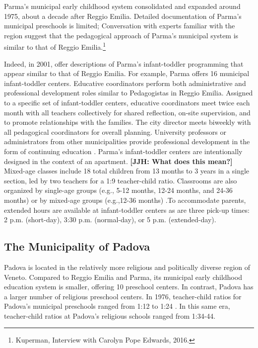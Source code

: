 Parma's municipal early childhood system consolidated and expanded around 1975, about a decade after Reggio Emilia. Detailed documentation of Parma's municipal preschools is limited; Conversation with experts familiar with the region suggest that the pedagogical approach of Parma's municipal system is similar to that of Reggio Emilia.\footnote{Kuperman, Interview with Carolyn Pope Edwards, 2016.}

Indeed, in 2001,\citet{Terzi-Cantarelli_2001_Parma} offer descriptions of Parma's infant-toddler programming that appear similar to that of Reggio Emilia. For example, Parma offers 16 municipal infant-toddler centers. Educative coordinators perform both administrative and professional development roles similar to Pedagogistas in Reggio Emilia. Assigned to a specific set of infant-toddler centers, educative coordinators meet twice each month with all teachers collectively for shared reflection, on-site supervision, and to promote relationships with the families. The city director meets biweekly with all pedagogical coordinators for overall planning. University professors or administrators from other municipalities provide professional development in the form of continuing education \citep{Terzi-Cantarelli_2001_Parma}. Parma's infant-toddler centers are intentionally designed in the context of an apartment. \textbf{[JJH: What does this mean?]} Mixed-age classes include 18 total children from 13 months to 3 years in a single section, led by two teachers  for a 1:9 teacher-child ratio. Classrooms are also organized by single-age groups (e.g., 5-12 months, 12-24 months, and 24-36 months) or by mixed-age groups (e.g.,12-36 months) \citep{Majorano-etal_2009_CC-in-P}.To accommodate parents, extended hours are available at infant-toddler centers as are three pick-up times: 2 p.m. (short-day), 3:30 p.m. (normal-day), or 5 p.m. (extended-day).

\subsection{The Municipality of Padova}

Padova is located in the relatively more religious and politically diverse region of Veneto. Compared to Reggio Emilia and Parma, its municipal early childhood education system is smaller, offering 10 preschool centers. In contrast, Padova has a larger number of religious preschool centers. In 1976, teacher-child ratios for Padova's municipal preschools ranged from 1:12 to 1:24 \citep{Padova-Admin-Data_1964-2011,CEHD_2016_Historical-Analysis}. In this same era, teacher-child ratios at Padova's religious schools ranged from 1:34-44.

